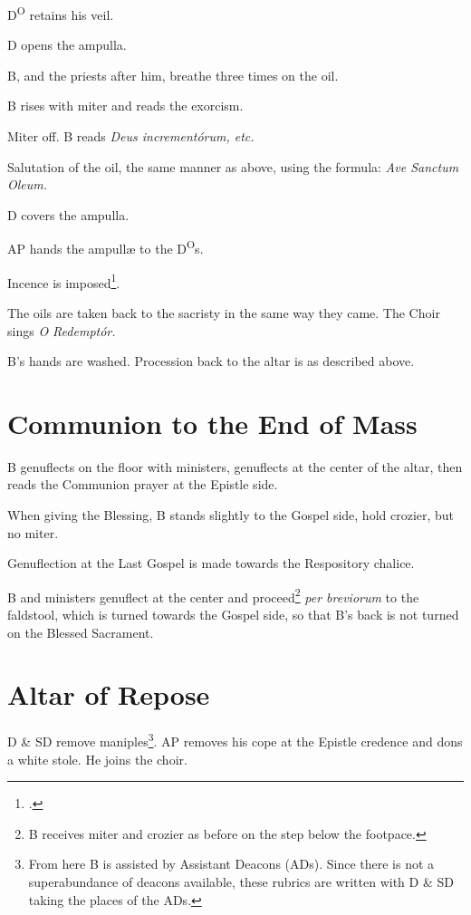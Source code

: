 {\rubric D\textsuperscript{O} retains his veil.

\rubric D opens the ampulla.

\rubric B, and the priests after him, breathe three times on the oil.

\rubric B rises with miter and reads the exorcism.

\rubric Miter off. B reads \textit{Deus incrementórum, etc.}

\rubric Salutation of the oil, the same manner as above, using the formula:
\textit{Ave Sanctum Oleum.}

\rubric D covers the ampulla.

\rubric AP hands the ampullæ to the D\textsuperscript{O}s.

\rubric Incence is imposed\footcite[It appears that B does not need to impose
this incense, but it can be done by MC1 or MC2 or by TH himself.][p.
190]{stehle}.

\rubric The oils are taken back to the sacristy in the same way they came. The
Choir sings \textit{O Redemptór.}

\rubric B's hands are washed. Procession back to the altar is as described
above.

\section{Communion to the End of Mass}

\rubric B genuflects on the floor with ministers, genuflects at the center of
the altar, then reads the Communion prayer at the Epistle side.

\rubric When giving the Blessing, B stands slightly to the Gospel side, hold
crozier, but no miter.

\rubric Genuflection at the Last Gospel is made towards the Respository
chalice.

\rubric B and ministers genuflect at the center and proceed\footnote{B receives
miter and crozier as before on the step below the footpace.} \textit{per
breviorum} to the faldstool, which is turned towards the Gospel side, so that
B's back is not turned on the Blessed Sacrament.

\section{Altar of Repose}

\rubric D \& SD remove maniples\footnote{From here B is assisted by Assistant
Deacons (ADs). Since there is not a superabundance of deacons available, these
rubrics are written with D \& SD taking the places of the ADs.}. AP removes his
cope at the Epistle credence and dons a white stole. He joins the choir.

}
